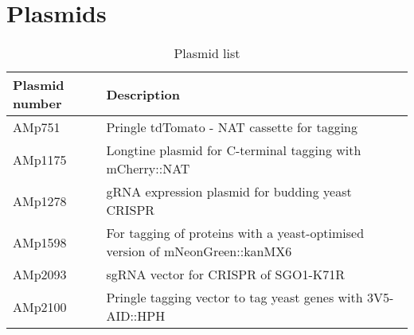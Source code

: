 \chapter{Plasmids}
\label{append:plasmids}

\begin{table}[htb]
\centering
\renewcommand{\arraystretch}{1.5}
\caption{Plasmid list}
\label{tab:plasmids}
\begin{tabular}{p{}p{}}
\hline
\textbf{Plasmid   number} & \textbf{Description}                                                                    \\
\hline
AMp751           & Pringle tdTomato - NAT cassette for tagging                                    \\
AMp1175          & Longtine plasmid for C-terminal tagging with mCherry::NAT                      \\
AMp1278          & gRNA expression plasmid for budding yeast CRISPR                               \\
AMp1598          & For tagging of proteins with a yeast-optimised version of   mNeonGreen::kanMX6 \\
AMp2093          & sgRNA vector for CRISPR of   SGO1-K71R                                         \\
AMp2100          & Pringle tagging vector to tag   yeast genes with 3V5-AID::HPH 
\\
\hline                                                             

\end{tabular}
\end{table}

